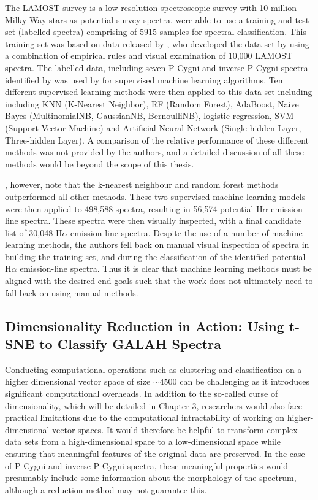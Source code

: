 The LAMOST survey is a low-resolution spectroscopic survey with 10 million Milky Way stars as potential survey spectra. \citet{zhang2021catalog} were able to use a training and test set (labelled spectra) comprising of 5915 samples for spectral classification. This training set was based on data released by \citet{hou2016catalog}, who developed the data set by using a combination of empirical rules and visual examination of 10,000 LAMOST spectra. The labelled data, including seven P Cygni and inverse P Cygni spectra identified by \citet{hou2016catalog} was used by \citet{zhang2021catalog} for supervised machine learning algorithms. Ten different supervised learning methods were then applied to this data set including including KNN (K-Nearest Neighbor), RF (Random Forest), AdaBoost, Naive Bayes (MultinomialNB, GaussianNB, BernoulliNB), logistic regression, SVM (Support Vector Machine) and Artificial Neural Network (Single-hidden Layer, Three-hidden Layer). A comparison of the relative performance of these different methods was not provided by the authors, and a detailed discussion of all these methods would be beyond the scope of this thesis. 

\citet{zhang2021catalog}, however, note that the k-nearest neighbour and random forest methods outperformed all other methods. These two supervised machine learning models were then applied to 498,588 spectra, resulting in 56,574 potential H$\alpha$ emission-line spectra. These spectra were then visually inspected, with a final candidate list of 30,048 H$\alpha$ emission-line spectra. Despite the use of a number of machine learning methods, the authors fell back on manual visual inspection of spectra in building the training set, and during the classification of the identified potential H$\alpha$ emission-line spectra. Thus it is clear that machine learning methods must be aligned with the desired end goals such that the work does not ultimately need to fall back on using manual methods.

\subsection{Dimensionality Reduction in Action: Using t-SNE to Classify GALAH Spectra}

Conducting computational operations such as clustering and classification on a higher dimensional vector space of size $\sim$4500 can be challenging as it introduces significant computational overheads. In addition to the so-called curse of dimensionality, which will be detailed in Chapter 3, researchers would also face practical limitations due to the computational intractability of working on higher-dimensional vector spaces. It would therefore be helpful to transform complex data sets from a high-dimensional space to a low-dimensional space while ensuring that meaningful features of the original data are preserved. In the case of P Cygni and inverse P Cygni spectra, these meaningful properties would presumably include some information about the morphology of the spectrum, although a reduction method may not guarantee this.

